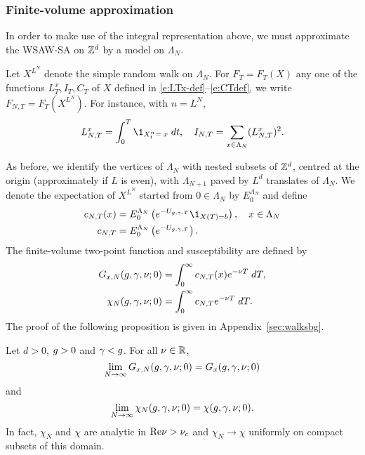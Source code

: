 \subsubsection{Finite-volume approximation}

In order to make use of the integral representation above, we must approximate the
WSAW-SA on ${ {{\mathbb Z}}^d }$ by a model on $\Lambda_N$.

Let $X^{L^N}$ denote the simple random walk on $\Lambda_N$.
For $F_T = F_T(X)$ any one of the functions $L_T^x,I_T,C_T$
of $X$ defined in \eqref{e:LTx-def}--\eqref{e:CTdef},
we write $F_{N,T} = F_T(X^{L^N})$. For instance, with $n=L^N$,
\begin{equation}
    L^x_{N,T} = \int_0^T \1_{X^{n}_t=\;x} \; dt,
    \quad I_{N,T} = \sum_{x \in \Lambda_N}(L_{N,T}^x)^2 .
\end{equation}

As before, we identify the vertices of $\Lambda_N$ with nested subsets of ${ {{\mathbb Z}}^d }$,
centred at the origin (approximately if $L$ is even),
with $\Lambda_{N+1}$ paved by $L^d$ translates of $\Lambda_N$.
We denote the expectation of $X^{L^N}$ started from $0 \in \Lambda_N$ by $E^{\Lambda_N}_0$
and define
\begin{align}
\label{e:cN}
c_{N,T}(x)
    &= E^{\Lambda_N}_0 \left( e^{-U_{\gcc,\gamma,T}} \1_{X(T)=b} \right),
    \quad x \in \Lambda_N \\
c_{N,T}
    &= E^{\Lambda_N}_0 \left( e^{-U_{\gcc,\gamma,T}} \right).
\end{align}
The finite-volume two-point function and susceptibility
are defined by
\begin{align}
G_{x,N}(g,\gamma,\nu; 0)
    &=
\int_0^\infty c_{N,T}(x) e^{-\nu T} \; dT, \\
\label{e:chiNdef-pre}
\chi_N(g, \gamma, \nu; 0)
    &=
\int_0^\infty c_{N,T} e^{-\nu T} \; dT.
\end{align}
The proof of the following proposition is given in Appendix~\ref{sec:walksbg}.

\begin{prop}
\label{prop:finvol}
Let $d >0$, $g >0$ and $\gamma < g$. For all $\nu \in {\mathbb R}$,
\begin{equation}
\label{e:Givlc}
\lim_{N \rightarrow \infty}
G_{x,N}(g,\gamma,\nu; 0)
=
G_x(g,\gamma,\nu; 0)
\end{equation}
and
\begin{equation}
\label{e:chilim-pre}
\lim_{N\rightarrow\infty}\chi_N(g,\gamma,\nu; 0) =   \chi(g,\gamma,\nu; 0).
\end{equation}
In fact, $\chi_N$ and $\chi$ are analytic in ${\rm Re} \nu > \nu_c$ and
$\chi_N \to \chi$ uniformly on compact subsets of this domain.
\end{prop}

